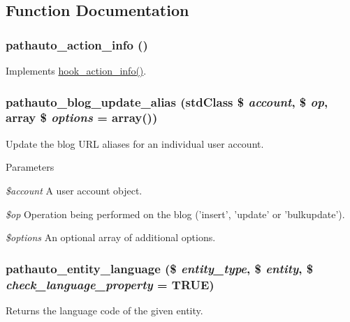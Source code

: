 \subsection{Function Documentation}
\hypertarget{pathauto_8module_a8ebf96e9fad62e05a7ea60bc34c85400}{
\subsubsection[{pathauto\_\-action\_\-info}]{\setlength{\rightskip}{0pt plus 5cm}pathauto\_\-action\_\-info ()}}
\label{pathauto_8module_a8ebf96e9fad62e05a7ea60bc34c85400}
Implements \hyperlink{group__actions_ga3df26c5d6496c91fcd0edd8648023fb4}{hook\_\-action\_\-info()}. \hypertarget{pathauto_8module_a7858e5dd55ede23c8dcee1da3513508a}{
\subsubsection[{pathauto\_\-blog\_\-update\_\-alias}]{\setlength{\rightskip}{0pt plus 5cm}pathauto\_\-blog\_\-update\_\-alias (stdClass \$ {\em account}, \/  \$ {\em op}, \/  array \$ {\em options} = {\ttfamily array()})}}
\label{pathauto_8module_a7858e5dd55ede23c8dcee1da3513508a}
Update the blog URL aliases for an individual user account.


\begin{DoxyParams}{Parameters}
\item[{\em \$account}]A user account object. \item[{\em \$op}]Operation being performed on the blog ('insert', 'update' or 'bulkupdate'). \item[{\em \$options}]An optional array of additional options. \end{DoxyParams}
\hypertarget{pathauto_8module_adef1a563cfdf18667ce09e30bacc5dd6}{
\subsubsection[{pathauto\_\-entity\_\-language}]{\setlength{\rightskip}{0pt plus 5cm}pathauto\_\-entity\_\-language (\$ {\em entity\_\-type}, \/  \$ {\em entity}, \/  \$ {\em check\_\-language\_\-property} = {\ttfamily TRUE})}}
\label{pathauto_8module_adef1a563cfdf18667ce09e30bacc5dd6}
Returns the language code of the given entity.

